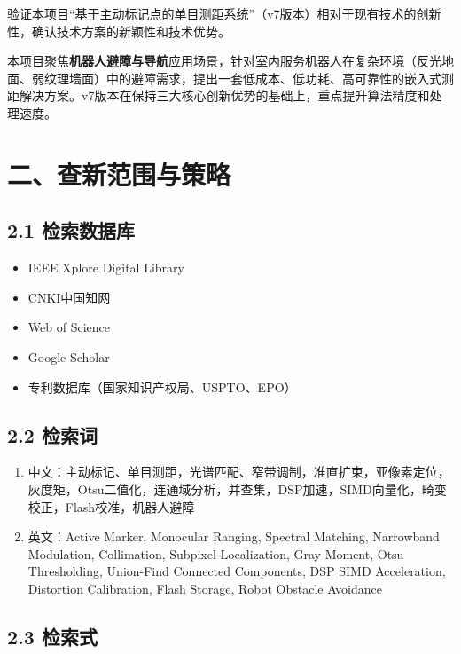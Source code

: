 \documentclass[12pt,a4paper]{article}
\begin{document}
验证本项目``基于主动标记点的单目测距系统''（v7版本）相对于现有技术的创新性，确认技术方案的新颖性和技术优势。

本项目聚焦\textbf{机器人避障与导航}应用场景，针对室内服务机器人在复杂环境（反光地面、弱纹理墙面）中的避障需求，提出一套低成本、低功耗、高可靠性的嵌入式测距解决方案。v7版本在保持三大核心创新优势的基础上，重点提升算法精度和处理速度。

\newpage

\section{二、查新范围与策略}

\subsection{2.1 检索数据库}

\begin{itemize}
\item IEEE Xplore Digital Library
\item CNKI中国知网
\item Web of Science
\item Google Scholar
\item 专利数据库（国家知识产权局、USPTO、EPO）
\end{itemize}

\subsection{2.2 检索词}

\begin{enumerate}
\item 中文：主动标记、单目测距，光谱匹配、窄带调制，准直扩束，亚像素定位，灰度矩，Otsu二值化，连通域分析，并查集，DSP加速，SIMD向量化，畸变校正，Flash校准，机器人避障
\item 英文：Active Marker, Monocular Ranging, Spectral Matching, Narrowband Modulation, Collimation, Subpixel Localization, Gray Moment, Otsu Thresholding, Union-Find Connected Components, DSP SIMD Acceleration, Distortion Calibration, Flash Storage, Robot Obstacle Avoidance
\end{enumerate}

\subsection{2.3 检索式}
\end{document}

